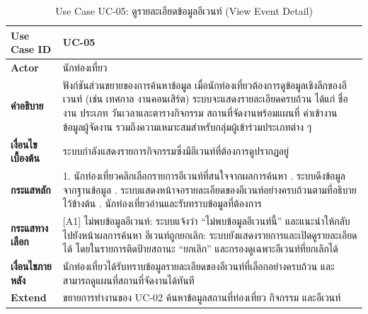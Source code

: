 \begin{table}[H]
\centering
\caption{Use Case UC-05: ดูรายละเอียดข้อมูลอีเวนท์ (View Event Detail)}
\label{tab:uc05}
\begin{tabular}{|p{3.2cm}|p{10cm}|}
\hline
\textbf{Use Case ID} & UC-05 \\ \hline
\textbf{Actor} & นักท่องเที่ยว \\ \hline
\textbf{คำอธิบาย} & ฟังก์ชันส่วนขยายของการค้นหาข้อมูล เมื่อนักท่องเที่ยวต้องการดูข้อมูลเชิงลึกของอีเวนท์ (เช่น เทศกาล งานคอนเสิร์ต) ระบบจะแสดงรายละเอียดครบถ้วน ได้แก่ ชื่องาน ประเภท วันเวลาและตารางกิจกรรม สถานที่จัดงานพร้อมแผนที่ ค่าเข้างาน ข้อมูลผู้จัดงาน รวมถึงความเหมาะสมสำหรับกลุ่มผู้เข้าร่วมประเภทต่าง ๆ \\ \hline
\textbf{เงื่อนไขเบื้องต้น} & ระบบกำลังแสดงรายการกิจกรรมซึ่งมีอีเวนท์ที่ต้องการดูปรากฏอยู่ \\ \hline
\textbf{กระแสหลัก} & 1. นักท่องเที่ยวคลิกเลือกรายการอีเวนท์ที่สนใจจากผลการค้นหา \newline 2. ระบบดึงข้อมูลจากฐานข้อมูล \newline 3. ระบบแสดงหน้าจอรายละเอียดของอีเวนท์อย่างครบถ้วนตามที่อธิบายไว้ข้างต้น \newline 4. นักท่องเที่ยวอ่านและรับทราบข้อมูลที่ต้องการ \\ \hline
\textbf{กระแสทางเลือก} & [A1] ไม่พบข้อมูลอีเวนท์: ระบบแจ้งว่า ``ไม่พบข้อมูลอีเวนท์นี้'' และแนะนำให้กลับไปยังหน้าผลการค้นหา \newline [A2] อีเวนท์ถูกยกเลิก: ระบบยังแสดงรายการและเปิดดูรายละเอียดได้ โดยในรายการติดป้ายสถานะ ``ยกเลิก'' และกรองดูเฉพาะอีเวนท์ที่ยกเลิกได้ \\ \hline
\textbf{เงื่อนไขภายหลัง} & นักท่องเที่ยวได้รับทราบข้อมูลรายละเอียดของอีเวนท์ที่เลือกอย่างครบถ้วน และสามารถดูแผนที่สถานที่จัดงานได้ทันที \\ \hline
\textbf{Extend} & ขยายการทำงานของ UC-02 ค้นหาข้อมูลสถานที่ท่องเที่ยว กิจกรรม และอีเวนท์ \\
\hline
\end{tabular}
\end{table}


